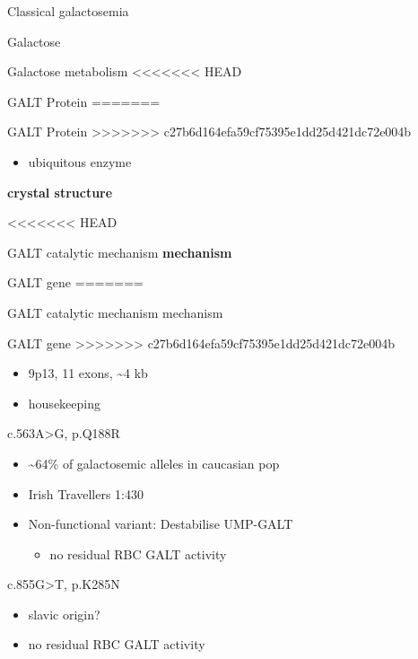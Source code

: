 \documentclass[presentation, smaller]{beamer}
\begin{document}
\begin{frame}[label={sec:orgheadline1}]{Classical galactosemia}
\begin{frame}[label={sec:orgheadline2}]{Galactose}
\begin{frame}[label={sec:orgheadline3}]{Galactose metabolism}
<<<<<<< HEAD
\begin{frame}[label={sec:orgheadline4}]{GALT Protein}
=======
\begin{frame}[label={sec:orgd09a685}]{GALT Protein}
>>>>>>> c27b6d164efa59cf75395e1dd25d421dc72e004b
\begin{itemize}
\item ubiquitous enzyme
\end{itemize}

\textbf{crystal structure}
\end{frame}

<<<<<<< HEAD
\begin{frame}[label={sec:orgheadline5}]{GALT catalytic mechanism}
\textbf{mechanism}
\end{frame}

\begin{frame}[label={sec:orgheadline6}]{GALT gene}
=======
\begin{frame}[label={sec:orgab7a534}]{GALT catalytic mechanism}
\alert{mechanism}
\end{frame}

\begin{frame}[label={sec:org28d1686}]{GALT gene}
>>>>>>> c27b6d164efa59cf75395e1dd25d421dc72e004b
\begin{itemize}
\item 9p13, 11 exons, \textasciitilde{}4 kb
\item housekeeping
\end{itemize}
\begin{block}{c.563A>G, p.Q188R}
\begin{itemize}
\item \textasciitilde{}64\% of galactosemic alleles in caucasian pop
\item Irish Travellers 1:430
\item Non-functional variant: Destabilise UMP-GALT
\begin{itemize}
\item no residual RBC GALT activity
\end{itemize}
\end{itemize}
\end{block}

\begin{block}{c.855G>T, p.K285N}
\begin{itemize}
\item slavic origin?
\item no residual RBC GALT activity
\end{itemize}
\end{block}
\end{frame}


\end{frame}
\end{frame}
\end{frame}
\end{frame}
\end{frame}
\end{document}
